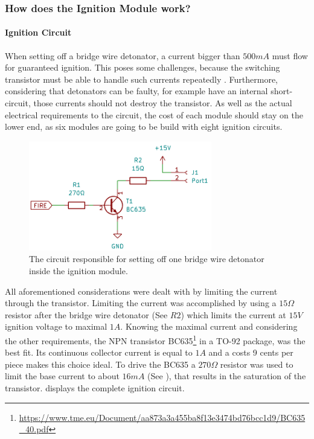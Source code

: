 \pagebreak

\subsubsection{How does the Ignition Module work?}
\label{Ignition Module work}
\paragraph{Ignition Circuit}
\noindent When setting off a bridge wire detonator, a current bigger than $500mA$ must flow for guaranteed ignition. This poses some challenges, because the switching transistor must be able to handle such currents repeatedly . Furthermore, considering that detonators can be faulty, for example have an internal short-circuit, those currents should not destroy the transistor. As well as the actual electrical requirements to the circuit, the cost of each module should stay on the lower end, as six modules are going to be build with eight ignition circuits.\\

\begin{figure}[!ht]
    \centering
    \includegraphics[width=8cm]{./Figures/module_ignitor.png}
    \caption{The circuit responsible for setting off one bridge wire detonator inside the ignition module.}
    \label{fig:module_ignitor}     
\end{figure}

\noindent All aforementioned considerations were dealt with by limiting the current through the transistor. Limiting the current was  accomplished by using a $15\Omega$ resistor after the bridge wire detonator (See  $R2$) which limits the current at $15V$ ignition voltage to maximal $1A$. Knowing the maximal current and considering the other requirements, the NPN transistor BC635\footnote{\url{https://www.tme.eu/Document/aa873a3a455ba8f13e3474bd76bcc1d9/BC635_40.pdf}} in a TO-92 package, was the best fit. Its continuous collector current is equal to $1A$ and a costs 9 cents per piece makes this choice ideal. To drive the BC635 a $270\Omega$ resistor was used to limit the base current to about $16mA$ (See ), that results in the saturation of the transistor.  displays the complete ignition circuit.

